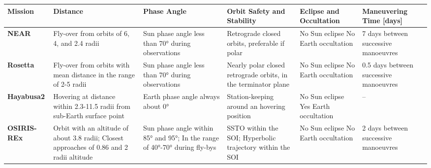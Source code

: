 \documentclass{Configuration_gigi/PoliMi3i_thesis}
\begin{document}
\begin{landscape}
\begin{table}[ht!]
\centering
\renewcommand{\arraystretch}{1.5}
\begin{tabular}{| >{\raggedright\arraybackslash}m{3cm} | >{\raggedright\arraybackslash}m{4cm} | >{\raggedright\arraybackslash}m{3.5cm} | >{\raggedright\arraybackslash}m{3.5cm} | >{\raggedright\arraybackslash}m{3.5cm} | >{\raggedright\arraybackslash}m{3.5cm} |}
\hline
\rowcolor{bluepoli!40}
\textbf{Mission} & \textbf{Distance } & \textbf{Phase Angle \newline [deg]} & \textbf{Orbit Safety and Stability} & \textbf{Eclipse and Occultation} & \textbf{Maneuvering Time [days]} \\
\hline\hline
\textbf{NEAR} & \footnotesize Fly-over from orbits of 6, 4, and 2.4 radii & \footnotesize Sun phase angle less than 70° during observations & \footnotesize Retrograde closed orbits, preferable if polar & \footnotesize No Sun eclipse \newline No Earth occultation & \footnotesize 7 days between successive manoeuvres \\
\hline
\textbf{Rosetta} & \footnotesize Fly-over from orbits with mean distance in the range of 2-5 radii & \footnotesize Sun phase angle less than 70° during observations & \footnotesize Nearly polar closed retrograde orbits, in the terminator plane  & \footnotesize No Sun eclipse \newline No Earth occultation & \footnotesize 0.5 days between successive manoeuvres \\
\hline
\textbf{Hayabusa2} & \footnotesize Hovering at distance within 2.3-11.5 radii from sub-Earth surface point & \footnotesize Earth phase angle always about 0° & \footnotesize Station-keeping around an hovering position & \footnotesize No Sun eclipse \newline Yes Earth occultation & -- \\
\hline
\textbf{OSIRIS-REx} & \footnotesize Orbit with an altitude of about 3.8 radii; \newline Closest approaches of 0.86 and 2 radii altitude & \footnotesize Sun phase angle within 85° and 95°; \newline In the range of 40°-70° during fly-bys  & \footnotesize SSTO within the SOI; \newline Hyperbolic trajectory within the SOI & \footnotesize No Sun eclipse \newline \footnotesize No Earth occultation & \footnotesize 2 days between successive manoeuvres \\

\end{tabular}
\end{table}
\end{landscape}
\end{document}
